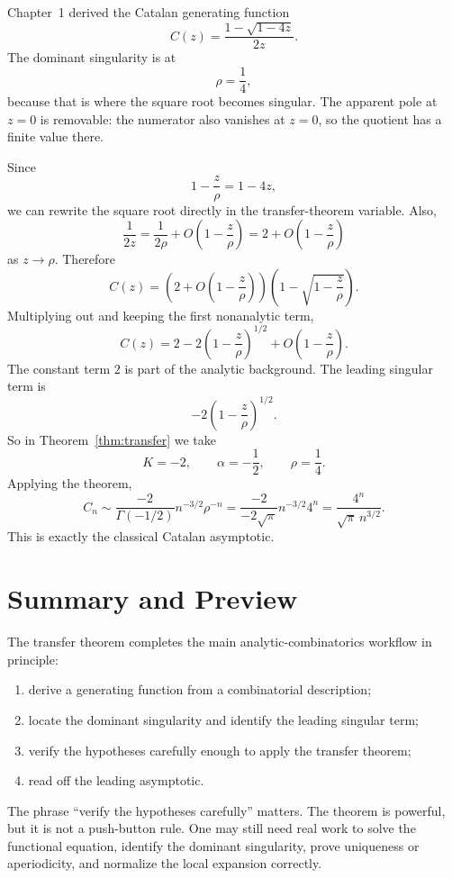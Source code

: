 \begin{example}
Chapter~1 derived the Catalan generating function
\[
  C(z) = \frac{1-\sqrt{1-4z}}{2z}.
\]
The dominant singularity is at
\[
  \rho = \frac{1}{4},
\]
because that is where the square root becomes singular. The apparent pole at $z=0$ is removable: the numerator also vanishes at $z=0$, so the quotient has a finite value there.

Since
\[
  1-\frac{z}{\rho} = 1-4z,
\]
we can rewrite the square root directly in the transfer-theorem variable. Also,
\[
  \frac{1}{2z} = \frac{1}{2\rho} + O\!\left(1-\frac{z}{\rho}\right) = 2 + O\!\left(1-\frac{z}{\rho}\right)
\]
as $z \to \rho$. Therefore
\[
  C(z)
  = \left(2 + O\!\left(1-\frac{z}{\rho}\right)\right)
    \left(1-\sqrt{1-\frac{z}{\rho}}\right).
\]
Multiplying out and keeping the first nonanalytic term,
\[
  C(z) = 2 - 2\left(1-\frac{z}{\rho}\right)^{1/2} + O\!\left(1-\frac{z}{\rho}\right).
\]
The constant term $2$ is part of the analytic background. The leading singular term is
\[
  -2\left(1-\frac{z}{\rho}\right)^{1/2}.
\]
So in Theorem~\ref{thm:transfer} we take
\[
  K=-2, \qquad \alpha = -\frac{1}{2}, \qquad \rho = \frac{1}{4}.
\]
Applying the theorem,
\[
  C_n \sim \frac{-2}{\Gamma(-1/2)} n^{-3/2} \rho^{-n}
  = \frac{-2}{-2\sqrt{\pi}} n^{-3/2} 4^n
  = \frac{4^n}{\sqrt{\pi}\,n^{3/2}}.
\]
This is exactly the classical Catalan asymptotic.
\end{example}

\section{Summary and Preview}

The transfer theorem completes the main analytic-combinatorics workflow in principle:
\begin{enumerate}
  \item derive a generating function from a combinatorial description;
  \item locate the dominant singularity and identify the leading singular term;
  \item verify the hypotheses carefully enough to apply the transfer theorem;
  \item read off the leading asymptotic.
\end{enumerate}

The phrase ``verify the hypotheses carefully'' matters. The theorem is powerful, but it is not a push-button rule. One may still need real work to solve the functional equation, identify the dominant singularity, prove uniqueness or aperiodicity, and normalize the local expansion correctly.

